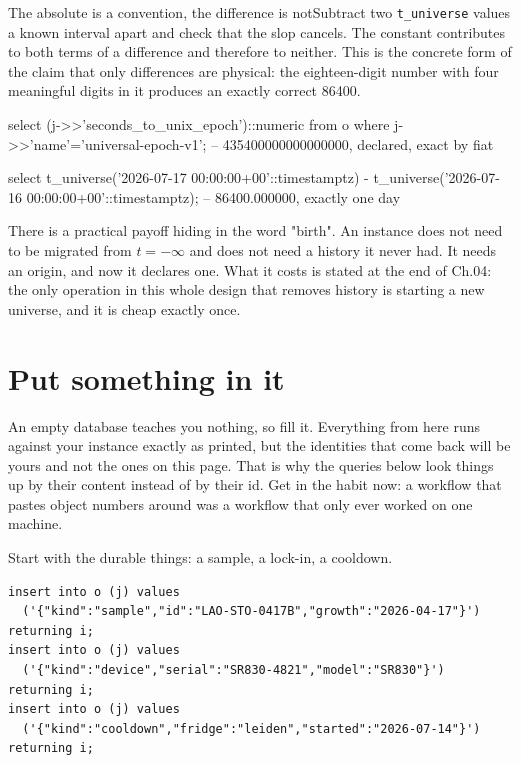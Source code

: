 \begin{Correspondence}{The absolute is a convention, the difference is not}{Subtract two \texttt{t\_universe} values a known interval apart and check that the slop cancels.}
The constant contributes to both terms of a difference and therefore to neither. This is the concrete form of the claim that only differences are physical: the eighteen-digit number with four meaningful digits in it produces an exactly correct 86400.
\begin{Check}
select (j->>'seconds_to_unix_epoch')::numeric from o
 where j->>'name'='universal-epoch-v1';
                                     -- 435400000000000000, declared, exact by fiat

select t_universe('2026-07-17 00:00:00+00'::timestamptz)
     - t_universe('2026-07-16 00:00:00+00'::timestamptz);
                                     -- 86400.000000, exactly one day
\end{Check}
\end{Correspondence}

There is a practical payoff hiding in the word "birth". An instance does not need to be migrated from $t = -\infty$ and does not need a history it never had. It needs an origin, and now it declares one. What it costs is stated at the end of Ch.04: the only operation in this whole design that removes history is starting a new universe, and it is cheap exactly once.

\section{Put something in it}

An empty database teaches you nothing, so fill it. Everything from here runs against your instance exactly as printed, but the identities that come back will be yours and not the ones on this page. That is why the queries below look things up by their content instead of by their id. Get in the habit now: a workflow that pastes object numbers around was a workflow that only ever worked on one machine.

Start with the durable things: a sample, a lock-in, a cooldown.

\begin{verbatim}
insert into o (j) values
  ('{"kind":"sample","id":"LAO-STO-0417B","growth":"2026-04-17"}') returning i;
insert into o (j) values
  ('{"kind":"device","serial":"SR830-4821","model":"SR830"}') returning i;
insert into o (j) values
  ('{"kind":"cooldown","fridge":"leiden","started":"2026-07-14"}') returning i;
\end{verbatim}

